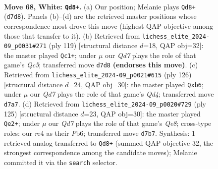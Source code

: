 \documentclass[11pt]{article}
\begin{document}
\clearpage

\begin{figure}[p]\centering
\begin{subfigure}{0.46\textwidth}\centering
\resizebox{\linewidth}{!}{%
\newchessgame
\chessboard[
  setfen={5k2/3Q4/5p1q/3p4/4r3/6P1/6KP/8 w - - 16 68},
  showmover=false,
  pgfstyle=straightmove, color=movearrow, markmove={d7-d8}
]}
\caption{}
\end{subfigure}\hfill
\begin{subfigure}{0.46\textwidth}\centering
\resizebox{\linewidth}{!}{%
\newchessgame
\chessboard[
  setfen={8/8/2P3pk/4Q2p/2q5/4K3/8/8 b - - 3 60},
  showmover=false,
  pgfstyle=straightmove, color=movearrow, markmove={c4-c1}
]}
\caption{}
\end{subfigure}
\\[4pt]
\begin{subfigure}{0.46\textwidth}\centering
\resizebox{\linewidth}{!}{%
\newchessgame
\chessboard[
  setfen={8/8/1p6/5k2/3Q3P/7K/2q3P1/8 w - - 0 64},
  showmover=false,
  pgfstyle=straightmove, color=movearrow, markmove={d4-b6}
]}
\caption{}
\end{subfigure}\hfill
\begin{subfigure}{0.46\textwidth}\centering
\resizebox{\linewidth}{!}{%
\newchessgame
\chessboard[
  setfen={8/3QP3/1p4p1/2k2p2/8/6P1/7K/4q3 b - - 6 63},
  showmover=false,
  pgfstyle=straightmove, color=movearrow, markmove={e1-e2}
]}
\caption{}
\end{subfigure}
\caption{\textbf{Move 68, White: \texttt{Qd8+}.} (a) Our position; Melanie plays \texttt{Qd8+} (\texttt{d7d8}). Panels (b)--(d) are the retrieved master positions whose correspondence most drove this move (highest QAP objective among those that transfer to it). (b) Retrieved from \texttt{lichess\_elite\_2024-09\_p0031\#271} (ply 119) [structural distance $d$=18, QAP obj=32]: the master played \texttt{Qc1+}; under $\mu$ our \emph{Qd7} plays the role of that game's \emph{Qc5}; transferred move \texttt{d7d8} \textbf{(endorses this move)}. (c) Retrieved from \texttt{lichess\_elite\_2024-09\_p0021\#615} (ply 126) [structural distance $d$=24, QAP obj=30]: the master played \texttt{Qxb6}; under $\mu$ our \emph{Qd7} plays the role of that game's \emph{Qd4}; transferred move \texttt{d7a7}. (d) Retrieved from \texttt{lichess\_elite\_2024-09\_p0020\#729} (ply 125) [structural distance $d$=23, QAP obj=30]: the master played \texttt{Qe2+}; under $\mu$ our \emph{Qd7} plays the role of that game's \emph{Qe8}; cross-type roles: our \emph{r}e4 as their \emph{P}b6; transferred move \texttt{d7b7}. Synthesis: 1 retrieved analog transferred to \texttt{Qd8+} (summed QAP objective 32, the strongest correspondence among the candidate moves); Melanie committed it via the \texttt{search} selector.}
\label{fig:thought-m134}
\end{figure}
\end{document}
